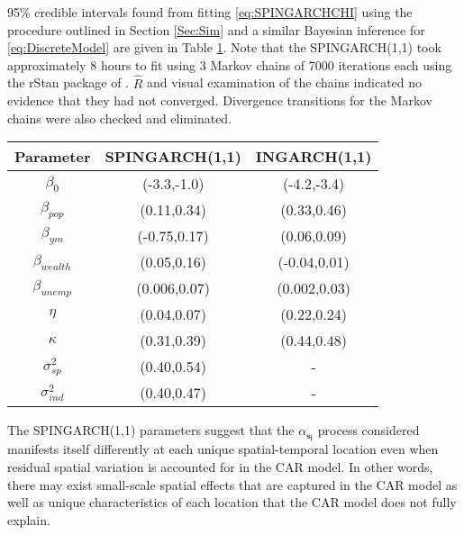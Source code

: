 \documentclass[11pt]{isuthesis}
\begin{document}
95\% credible intervals found from fitting \eqref{eq:SPINGARCHCHI} using the procedure outlined in Section \ref{Sec:Sim} and a similar Bayesian inference for \eqref{eq:DiscreteModel} are given in Table \ref{Table:ResultsChi}.  Note that the SPINGARCH(1,1) took approximately 8 hours to fit using 3 Markov chains of 7000 iterations each using the rStan package of \cite{carpenter2016stan}.  $\hat{R}$ and visual examination of the chains indicated no evidence that they had not converged.  Divergence transitions for the Markov chains were also checked and eliminated.


\begin{table}[!htp]
	\begin{center}
		\begin{tabular}{ |c|c|c| } 
			\hline
			Parameter & SPINGARCH(1,1) & INGARCH(1,1) \\
			\hline 
			$\beta_0$ & (-3.3,-1.0) & (-4.2,-3.4) \\
			$\beta_{pop}$ & (0.11,0.34) & (0.33,0.46)\\
			$\beta_{ym}$ & (-0.75,0.17)& (0.06,0.09)\\
			$\beta_{wealth}$&(0.05,0.16) & (-0.04,0.01)\\
			$\beta_{unemp}$ & (0.006,0.07)& (0.002,0.03) \\
			$\eta$ & (0.04,0.07) & (0.22,0.24)\\
			$\kappa$ & (0.31,0.39)& (0.44,0.48)\\
			$\sigma_{sp}^2$ & (0.40,0.54) & - \\
			$\sigma_{ind}^2$& (0.40,0.47)& - \\
			\hline
		\end{tabular}
	\end{center}
	\label{Table:ResultsChi}
\end{table}

The SPINGARCH(1,1) parameters suggest that the $\alpha_{\boldsymbol{s_i}}$ process considered manifests itself differently at each unique spatial-temporal location even when residual spatial variation is accounted for in the CAR model.  In other words, there may exist small-scale spatial effects that are captured in the CAR model as well as unique characteristics of each location that the CAR model does not fully explain.
  
\end{document}
